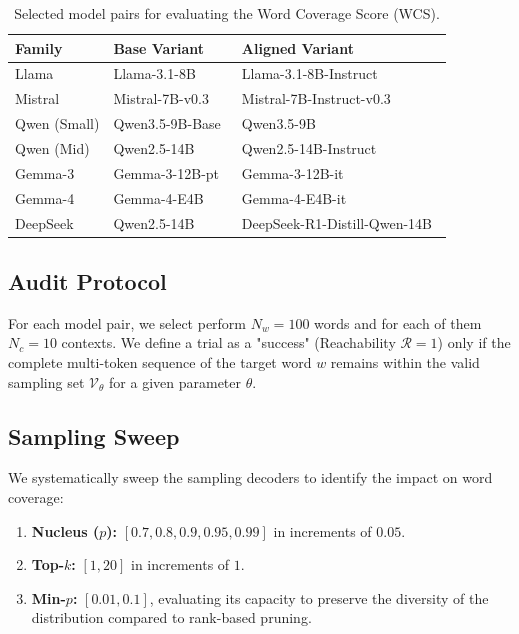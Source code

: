 \documentclass{article}
\begin{document}
\begin{table}[h]
\centering
\begin{tabular}{l l l}
\hline
\textbf{Family} & \textbf{Base Variant} & \textbf{Aligned Variant} \\
\hline
Llama & Llama-3.1-8B~\cite{hf-llama31-8b} & Llama-3.1-8B-Instruct~\cite{hf-llama31-8b-instruct} \\
Mistral & Mistral-7B-v0.3~\cite{hf-mistral7b-v03} & Mistral-7B-Instruct-v0.3~\cite{hf-mistral7b-instruct-v03} \\
Qwen (Small) & Qwen3.5-9B-Base~\cite{hf-qwen35-9b-base} & Qwen3.5-9B~\cite{hf-qwen35-9b} \\
Qwen (Mid) & Qwen2.5-14B~\cite{hf-qwen25-14b} & Qwen2.5-14B-Instruct~\cite{hf-qwen25-14b-instruct} \\
Gemma-3 & Gemma-3-12B-pt~\cite{hf-gemma3-12b-pt} & Gemma-3-12B-it~\cite{hf-gemma3-12b-it} \\
Gemma-4 & Gemma-4-E4B~\cite{hf-gemma4-e4b} & Gemma-4-E4B-it~\cite{hf-gemma4-e4b-it} \\
DeepSeek & Qwen2.5-14B~\cite{hf-qwen25-14b} & DeepSeek-R1-Distill-Qwen-14B~\cite{hf-deepseek-r1-qwen14b} \\
\hline
\end{tabular}
\caption{Selected model pairs for evaluating the Word Coverage Score (WCS).}
\label{tab:models}
\end{table}


\subsection{Audit Protocol}

For each model pair, we select perform $N_w=100$ words and for each of them $N_c=10$ contexts. We define a trial as a "success" (Reachability $\mathcal{R}=1$) only if the complete multi-token sequence of the target word $w$ remains within the valid sampling set $\mathcal{V}_\theta$ for a given parameter $\theta$.

\subsection{Sampling Sweep}

We systematically sweep the sampling decoders to identify the impact on word coverage:

\begin{enumerate}
    \item \textbf{Nucleus ($p$):} $[0.7, 0.8, 0.9, 0.95, 0.99]$ in increments of $0.05$.
    \item \textbf{Top-$k$:} $[1, 20]$ in increments of $1$.
    \item \textbf{Min-$p$:} $[0.01, 0.1]$, evaluating its capacity to preserve the diversity of the distribution compared to rank-based pruning.
\end{enumerate}
\end{document}
